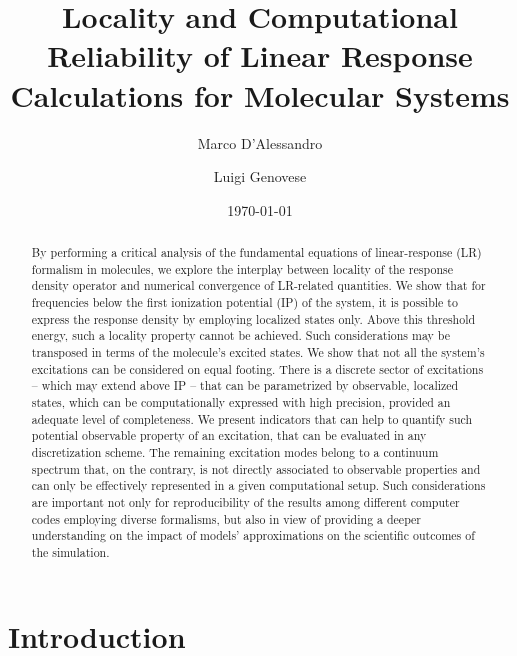 \documentclass[reprint,aps,prb]{revtex4-1}
\begin{document}


\title{Locality and Computational Reliability of Linear Response Calculations for Molecular Systems}
\author{Marco D'Alessandro}
\author{Luigi Genovese}
\date{\today}

\begin{abstract}
By performing a critical analysis of the fundamental equations of linear-response (LR) formalism in molecules,
we explore the interplay between locality of the response density operator and  numerical convergence of LR-related quantities.
We show that for frequencies below the first ionization potential (IP) of the system, it is possible to express the response density by employing localized states only.
Above this threshold energy, such a locality property cannot be achieved.
Such considerations may be transposed in terms of the molecule's excited states. We show that not all the system's excitations can be considered on equal footing.
There is a discrete sector of excitations -- which may extend above IP -- that can be parametrized by observable, localized states, which can be computationally expressed with high precision, provided an adequate level of completeness.
We present indicators that can help to quantify such potential observable property of an excitation, that can be evaluated
in any discretization scheme.
The remaining excitation modes belong to a continuum spectrum that, on the contrary, is not directly associated to observable properties and can only be effectively represented in a given computational setup.
Such considerations are important not only for reproducibility of the results among different computer codes
employing diverse formalisms, but also in view of providing a deeper understanding on the impact of models'
approximations on the scientific outcomes of the simulation.
\end{abstract}

\maketitle

\section{Introduction}
\end{document}
